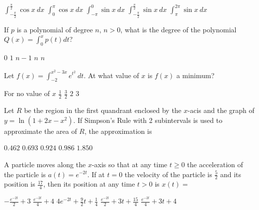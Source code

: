 \begin{questions}
    \begin{oneparchoices}
    \choice $\int_{-\frac{\pi}{2}}^\frac{\pi}{2} \cos x\ dx$
    \CorrectChoice $\int_0^\pi \cos x\ dx$
    \choice $\int_{-\pi}^0 \sin x\ dx$
    \choice $\int_{-\frac{\pi}{2}}^\frac{\pi}{2} \sin x\ dx$
    \choice $\int_\pi^{2\pi} \sin x\ dx$
    \end{oneparchoices}

\question[2] If $p$ is a polynomial of degree $n$, $n > 0$, what is
    the degree of the polynomial $Q(x) = \int_0^x p(t)dt$?

    \begin{oneparchoices}
    \choice $0$
    \choice $1$
    \choice $n - 1$
    \choice $n$
    \CorrectChoice $n$
    \end{oneparchoices}

\question[2] Let $f(x) = \int_{-2}^{x^2 - 3x} e^{t^2}\ dt.$ At what
    value of $x$ is $f(x)$ a minimum?

    \begin{oneparchoices}
    \choice For no value of $x$
    \choice $\frac{1}{2}$
    \CorrectChoice $\frac{3}{2}$
    \choice $2$
    \choice $3$
    \end{oneparchoices}

\question[2] Let $R$ be the region in the first quandrant enclosed by
    the $x$-acis and the graph of $y = \ln(1 + 2x - x^2)$. If
    Simpson's Rule with 2 subintervals is used to approximate the area
    of $R$, the approximation is

    \begin{oneparchoices}
    \choice $0.462$
    \choice $0.693$
    \CorrectChoice $0.924$
    \choice $0.986$
    \choice $1.850$
    \end{oneparchoices}

\question[2] A particle moves along the $x$-axis so that at any time
    $t \ge 0$ the acceleration of the particle is $a(t) = e^{-2t}$. If
    at $t = 0$ the velocity of the particle is $\frac{5}{2}$ and its
    position is $\frac{17}{4}$, then its position at any time $t > 0$
    is $x(t) = $

    \begin{oneparchoices}
    \choice $-\frac{e^{-2t}}{2} + 3$
    \choice $\frac{e^{-2t}}{4} + 4$
    \choice $4e^{-2t} + \frac{9}{2}t + \frac{1}{4}$
    \choice $\frac{e^{-2t}}{2} + 3t + \frac{15}{4}$
    \CorrectChoice $\frac{e^{-2t}}{4} + 3t + 4$
    \end{oneparchoices}


\end{questions}
